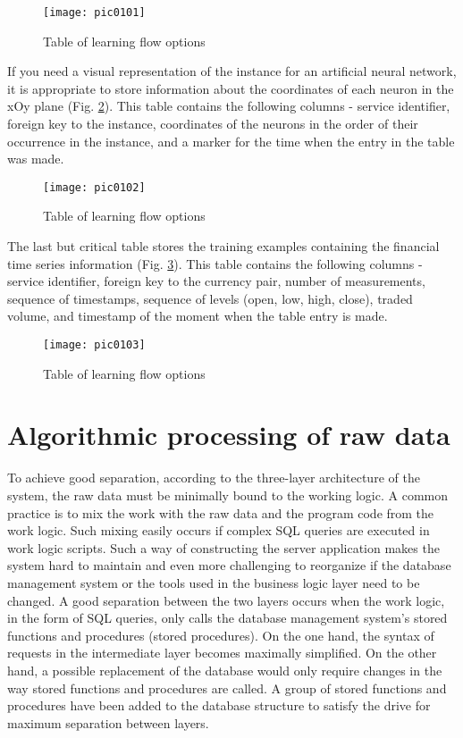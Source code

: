 \begin{figure}[h]
\centering
\texttt{[image: pic0101]}
\caption{Table of learning flow options}
\label{fig:pic0101}
\end{figure}
\FloatBarrier

If you need a visual representation of the instance for an artificial neural network, it is appropriate to store information about the coordinates of each neuron in the xOy plane (Fig. \ref{fig:pic0102}). This table contains the following columns - service identifier, foreign key to the instance, coordinates of the neurons in the order of their occurrence in the instance, and a marker for the time when the entry in the table was made.

\begin{figure}[h]
\centering
\texttt{[image: pic0102]}
\caption{Table of learning flow options}
\label{fig:pic0102}
\end{figure}
\FloatBarrier

The last but critical table stores the training examples containing the financial time series information (Fig. \ref{fig:pic0103}). This table contains the following columns - service identifier, foreign key to the currency pair, number of measurements, sequence of timestamps, sequence of levels (open, low, high, close), traded volume, and timestamp of the moment when the table entry is made.

\begin{figure}[h]
\centering
\texttt{[image: pic0103]}
\caption{Table of learning flow options}
\label{fig:pic0103}
\end{figure}
\FloatBarrier

\section{Algorithmic processing of raw data}

To achieve good separation, according to the three-layer architecture of the system, the raw data must be minimally bound to the working logic. A common practice is to mix the work with the raw data and the program code from the work logic. Such mixing easily occurs if complex SQL queries are executed in work logic scripts. Such a way of constructing the server application makes the system hard to maintain and even more challenging to reorganize if the database management system or the tools used in the business logic layer need to be changed. A good separation between the two layers occurs when the work logic, in the form of SQL queries, only calls the database management system's stored functions and procedures (stored procedures). On the one hand, the syntax of requests in the intermediate layer becomes maximally simplified. On the other hand, a possible replacement of the database would only require changes in the way stored functions and procedures are called. A group of stored functions and procedures have been added to the database structure to satisfy the drive for maximum separation between layers.

